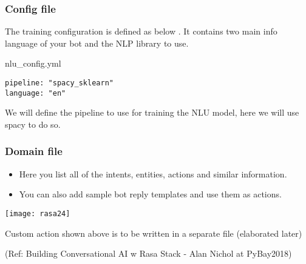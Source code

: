  \begin{frame}[fragile]\frametitle{Config file}
 
 The training configuration is defined as below . It contains two main info language of your bot and the NLP library to use.
 
 
nlu\_config.yml


\begin{lstlisting}
pipeline: "spacy_sklearn"
language: "en"
\end{lstlisting}

We will define the pipeline to use for training the NLU model, here we will use spacy to do so.
\end{frame}

 \begin{frame}[fragile]\frametitle{Domain file}
 
\begin{itemize}
\item Here you list all of the intents, entities, actions and similar information. 
\item You can also add sample bot reply templates and use them as actions.
\end{itemize}

\begin{center}
\texttt{[image: rasa24]}
\end{center}

Custom action shown above is to be written in a separate file (elaborated later)


{\tiny (Ref: Building Conversational AI w Rasa Stack - Alan Nichol at PyBay2018)}

\end{frame}







